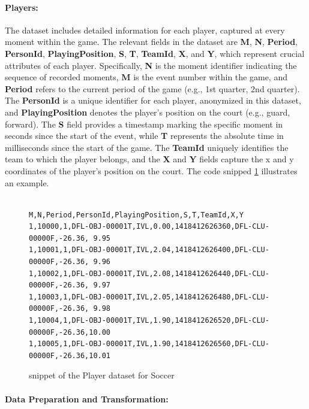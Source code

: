 \paragraph {Players:}
\label{sect:players}

The dataset includes detailed information for each player, captured at every moment within the game. The relevant fields in the dataset are \textbf{M}, \textbf{N}, \textbf{Period}, \textbf{PersonId}, \textbf{PlayingPosition}, \textbf{S}, \textbf{T}, \textbf{TeamId}, \textbf{X}, and \textbf{Y}, which represent crucial attributes of each player. Specifically, \textbf{N} is the moment identifier indicating the sequence of recorded moments, \textbf{M} is the event number within the game, and \textbf{Period} refers to the current period of the game (e.g., 1st quarter, 2nd quarter). The \textbf{PersonId} is a unique identifier for each player, anonymized in this dataset, and \textbf{PlayingPosition} denotes the player's position on the court (e.g., guard, forward). The \textbf{S} field provides a timestamp marking the specific moment in seconds since the start of the event, while \textbf{T} represents the absolute time in milliseconds since the start of the game. The \textbf{TeamId} uniquely identifies the team to which the player belongs, and the \textbf{X} and \textbf{Y} fields capture the x and y coordinates of the player's position on the court. The code snipped \ref{fig:player-dataset} illustrates an example.


\begin{figure}[H]
    \centering
    \begin{BVerbatim}
           M,N,Period,PersonId,PlayingPosition,S,T,TeamId,X,Y
1,10000,1,DFL-OBJ-00001T,IVL,0.00,1418412626360,DFL-CLU-00000F,-26.36, 9.95
1,10001,1,DFL-OBJ-00001T,IVL,2.04,1418412626400,DFL-CLU-00000F,-26.36, 9.96
1,10002,1,DFL-OBJ-00001T,IVL,2.08,1418412626440,DFL-CLU-00000F,-26.36, 9.97
1,10003,1,DFL-OBJ-00001T,IVL,2.05,1418412626480,DFL-CLU-00000F,-26.36, 9.98
1,10004,1,DFL-OBJ-00001T,IVL,1.90,1418412626520,DFL-CLU-00000F,-26.36,10.00
1,10005,1,DFL-OBJ-00001T,IVL,1.90,1418412626560,DFL-CLU-00000F,-26.36,10.01
    \end{BVerbatim}
    \caption{snippet of the Player dataset for Soccer}
    \label{fig:player-dataset}
\end{figure}


\paragraph {Data Preparation and Transformation:}
\label{sect:data-prep-soccer}

